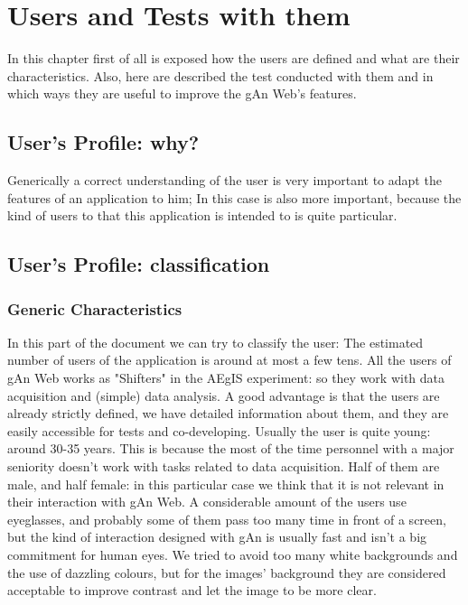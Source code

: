 
\chapter{Users and Tests with them} %

\label{Chapter9} %

In this chapter first of all is exposed how the users are defined and what are their characteristics. Also, here are described the test conducted with them and in which ways they are useful to improve the gAn Web's features.   

\section{User's Profile: why?}

Generically a correct understanding of the user is very important to adapt the features of an application to him; In this case is also more important, because the kind of users to that this application is intended to is quite particular.


\section{User's Profile: classification}

\subsection{Generic Characteristics}
In this part of the document we can try to classify the user:
The estimated number of users of the application is around at most a few tens.
All the users of gAn Web works as "Shifters" in the AEgIS experiment: so they work with data acquisition and (simple) data analysis.
A good advantage is that the users are already strictly defined, we have detailed information about them, and they are easily accessible for tests and co-developing.
Usually the user is quite young: around 30-35 years. This is because the most of the time personnel with a major seniority doesn't work with tasks related to data acquisition. 
Half of them are male, and half female: in this particular case we think that it is not relevant in their interaction with gAn Web.
A considerable amount of the users use eyeglasses, and probably some of them pass too many time in front of a screen, but the kind of interaction designed with gAn is usually fast and isn't a big commitment for human eyes. We tried to avoid too many white backgrounds and the use of dazzling colours, but for the images' background they are considered acceptable to improve contrast and let the image to be more clear.  

